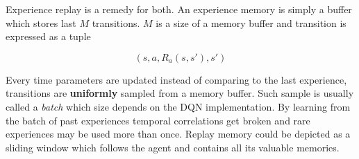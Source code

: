 Experience replay is a remedy for both. An experience memory is simply a buffer which stores last $M$ transitions. $M$ is a size of a memory buffer and transition is expressed as a tuple

\begin{equation}
    \left(s, a, R_a(s, s'), s'\right)
\end{equation}

Every time parameters are updated instead of comparing to the last experience, transitions are \textbf{uniformly} sampled from a memory buffer. Such sample is usually called a \emph{batch} which size depends on the DQN implementation. By learning from the batch of past experiences temporal correlations get broken and rare experiences may be used more than once. Replay memory could be depicted as a sliding window which follows the agent and contains all its valuable memories. 